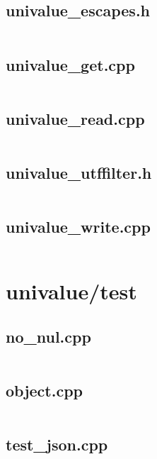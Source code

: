 \documentclass{article}
\begin{document}
\subsection{univalue\_escapes.h}
\inputminted{cpp}{/home/dufferzafar/dev/@clones/bitcoin/src/univalue/lib/univalue_escapes.h}
\newpage

\subsection{univalue\_get.cpp}
\inputminted{cpp}{/home/dufferzafar/dev/@clones/bitcoin/src/univalue/lib/univalue_get.cpp}
\newpage

\subsection{univalue\_read.cpp}
\inputminted{cpp}{/home/dufferzafar/dev/@clones/bitcoin/src/univalue/lib/univalue_read.cpp}
\newpage

\subsection{univalue\_utffilter.h}
\inputminted{cpp}{/home/dufferzafar/dev/@clones/bitcoin/src/univalue/lib/univalue_utffilter.h}
\newpage

\subsection{univalue\_write.cpp}
\inputminted{cpp}{/home/dufferzafar/dev/@clones/bitcoin/src/univalue/lib/univalue_write.cpp}
\newpage

\section{univalue/test}

\subsection{no\_nul.cpp}
\inputminted{cpp}{/home/dufferzafar/dev/@clones/bitcoin/src/univalue/test/no_nul.cpp}
\newpage

\subsection{object.cpp}
\inputminted{cpp}{/home/dufferzafar/dev/@clones/bitcoin/src/univalue/test/object.cpp}
\newpage

\subsection{test\_json.cpp}
\inputminted{cpp}{/home/dufferzafar/dev/@clones/bitcoin/src/univalue/test/test_json.cpp}
\newpage
\end{document}
